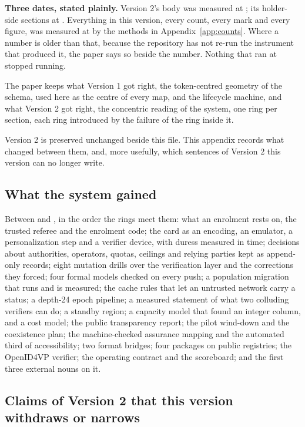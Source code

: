 \textbf{Three dates, stated plainly.} Version 2's body was measured at ; its
holder-side sections at . Everything in this version, every count, every mark and every
figure, was measured at  by the methods in Appendix~\ref{app:counts}. Where a number
is older than that, because the repository has not re-run the instrument that produced it, the paper
says so beside the number. Nothing that ran at  stopped running.

The paper keeps what Version 1 got right, the token-centred geometry of the schema, used here as the
centre of every map, and the lifecycle machine, and what Version 2 got right, the concentric reading
of the system, one ring per section, each ring introduced by the failure of the ring inside it.

Version 2 is preserved unchanged beside this file. This appendix records what changed between
them, and, more usefully, which sentences of Version 2 this version can no longer write.

\subsection*{What the system gained}

Between  and , in the order the rings meet them: what an enrolment
rests on, the trusted referee and the enrolment code; the card as an encoding, an emulator, a
personalization step and a verifier device, with duress measured in time; decisions about
authorities, operators, quotas, ceilings and relying parties kept as append-only records; eight
mutation drills over the verification layer and the corrections they forced; four formal models
checked on every push; a population migration that runs and is measured; the cache rules that let an
untrusted network carry a status; a depth-24 epoch pipeline; a measured statement of what two
colluding verifiers can do; a standby region; a capacity model that found an integer column, and a
cost model; the public transparency report; the pilot wind-down and the coexistence plan; the
machine-checked assurance mapping and the automated third of accessibility; two format bridges; four
packages on public registries; the OpenID4VP verifier; the operating contract and the scoreboard; and
the first three external nouns on it.

\subsection*{Claims of Version 2 that this version withdraws or narrows}

